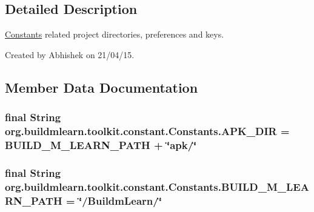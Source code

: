\subsection{Detailed Description}
\hyperlink{classorg_1_1buildmlearn_1_1toolkit_1_1constant_1_1Constants}{Constants} related project directories, preferences and keys. 

Created by Abhishek on 21/04/15. 

\subsection{Member Data Documentation}
\hypertarget{classorg_1_1buildmlearn_1_1toolkit_1_1constant_1_1Constants_ad32e350b2a3bc331971d274727ce69c5}{
\subsubsection[{A\-P\-K\-\_\-\-D\-I\-R}]{\setlength{\rightskip}{0pt plus 5cm}final String org.\-buildmlearn.\-toolkit.\-constant.\-Constants.\-A\-P\-K\-\_\-\-D\-I\-R = {\bf B\-U\-I\-L\-D\-\_\-\-M\-\_\-\-L\-E\-A\-R\-N\-\_\-\-P\-A\-T\-H} + \char`\"{}apk/\char`\"{}\hspace{0.3cm}{\ttfamily [static]}}}\label{classorg_1_1buildmlearn_1_1toolkit_1_1constant_1_1Constants_ad32e350b2a3bc331971d274727ce69c5}
\hypertarget{classorg_1_1buildmlearn_1_1toolkit_1_1constant_1_1Constants_a9965876f735c5e8a6b5b1b187878da87}{
\subsubsection[{B\-U\-I\-L\-D\-\_\-\-M\-\_\-\-L\-E\-A\-R\-N\-\_\-\-P\-A\-T\-H}]{\setlength{\rightskip}{0pt plus 5cm}final String org.\-buildmlearn.\-toolkit.\-constant.\-Constants.\-B\-U\-I\-L\-D\-\_\-\-M\-\_\-\-L\-E\-A\-R\-N\-\_\-\-P\-A\-T\-H = \char`\"{}/Buildm\-Learn/\char`\"{}\hspace{0.3cm}{\ttfamily [static]}}}\label{classorg_1_1buildmlearn_1_1toolkit_1_1constant_1_1Constants_a9965876f735c5e8a6b5b1b187878da87}

